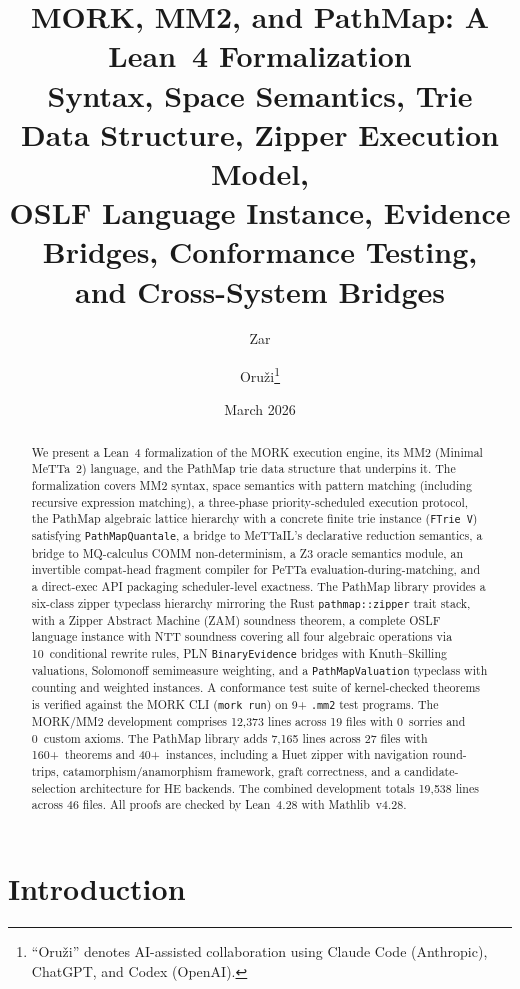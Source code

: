 \documentclass[11pt]{article}
\title{MORK, MM2, and PathMap: A Lean~4 Formalization\\
\large Syntax, Space Semantics, Trie Data Structure, Zipper Execution Model,\\
OSLF Language Instance, Evidence Bridges, Conformance Testing,\\
and Cross-System Bridges}
\author{Zar \and Oru\v{z}i\footnote{%
``Oru\v{z}i'' denotes AI-assisted collaboration
using Claude Code (Anthropic), ChatGPT, and Codex (OpenAI).}}
\date{March 2026}
\theoremstyle{definition}
\theoremstyle{remark}
\newcommand{\MORK}{\textup{MORK}}
\newcommand{\MeTTa}{\textup{MeTTa}}
\newcommand{\MeTTaIL}{\textup{MeTTaIL}}
\newcommand{\HE}{\textup{HE}}
\newcommand{\PathMap}{\textup{PathMap}}
\begin{document}
\maketitle

\begin{abstract}
We present a Lean~4 formalization of the \MORK{} execution engine, its
MM2 (Minimal \MeTTa{}~2) language, and the \PathMap{} trie data structure
that underpins it.
The formalization covers MM2 syntax, space semantics with pattern matching
(including recursive expression matching), a three-phase priority-scheduled
execution protocol, the \PathMap{} algebraic lattice hierarchy with a
concrete finite trie instance (\texttt{FTrie\,V}) satisfying
\texttt{PathMapQuantale}, a bridge to \MeTTaIL{}'s declarative reduction
semantics, a bridge to MQ-calculus COMM non-determinism,
a Z3 oracle semantics module,
an invertible compat-head fragment compiler for PeTTa evaluation-during-matching,
and a direct-exec API packaging scheduler-level exactness.
%
The \PathMap{} library provides a six-class zipper typeclass hierarchy
mirroring the Rust \texttt{pathmap::zipper} trait stack, with a Zipper Abstract
Machine (ZAM) soundness theorem, a complete OSLF language instance with
NTT soundness covering all four algebraic operations via 10~conditional
rewrite rules, PLN \texttt{BinaryEvidence} bridges with Knuth--Skilling
valuations, Solomonoff semimeasure weighting, and a \texttt{PathMapValuation}
typeclass with counting and weighted instances.
%
A conformance test suite of kernel-checked theorems is verified against
the \MORK{} CLI (\texttt{mork run}) on 9+ \texttt{.mm2} test programs.
The \MORK{}/MM2 development comprises 12{,}373 lines across 19 files with
0~sorries and 0~custom axioms.
The \PathMap{} library adds 7{,}165 lines across 27 files with
160+~theorems and 40+~instances, including a Huet zipper with
navigation round-trips, catamorphism/anamorphism framework,
graft correctness, and a candidate-selection architecture for
\HE{} backends.
The combined development totals 19{,}538 lines across 46 files.
All proofs are checked by Lean~4.28 with Mathlib~v4.28.
\end{abstract}

\tableofcontents

\section{Introduction}
\label{sec:intro}
\end{document}
